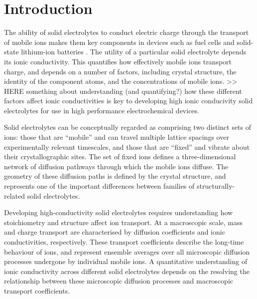 \documentclass[aps,prb,twocolumn,superscriptaddress,reprint]{revtex4-1}
\begin{document}
\maketitle

\section{Introduction}

The ability of solid electrolytes to conduct electric charge through the transport of mobile ions makes them key components in devices such as fuel cells and solid-state lithium-ion batteries \cite{BachmanEtAl_ChemRev2016, ManthiramEtAl_NatRevMater2017,GoodenoughAndSingh_JElectrochemSoc2015, MalavasiEtAl_ChemSocRev2010}. The utility of a particular solid electrolyte depends its ionic conductivity. This quantifies how effectively mobile ions transport charge, and depends on a number of factors, including crystal structure, the identity of the component atoms, and the concentrations of mobile ions. >> HERE something about understanding (and quantifying?) how these different factors affect ionic conductivities is key to developing high ionic conducivity solid electrolytes for use in high performance electrochemical devices.

Solid electrolytes can be conceptually regarded as comprising two distinct sets of ions: those that are ``mobile'' and can travel multiple lattice spacings over experimentally relevant timescales, and those that are ``fixed'' and vibrate about their crystallographic sites. 
The set of fixed ions defines a three-dimensional network of diffusion pathways through which the mobile ions diffuse. 
The geometry of these diffusion paths is defined by the crystal structure, and represents one of the important differences between families of structurally-related solid electrolytes.

Developing high-conductivity solid electrolytes requires understanding how stoichiometry and structure affect ion transport. 
At a macroscopic scale, mass and charge transport are characterised by diffusion coefficients and ionic conductivities, respectively. 
These transport coefficients describe the long-time behaviour of ions, and represent ensemble averages over all microscopic diffusion processes undergone by individual mobile ions. 
A quantitative understanding of ionic conductivity across different solid electrolytes depends on the resolving the relationship between these microscopic diffusion processes and macroscopic transport coefficients.  
\end{document}
